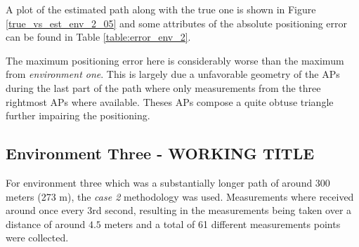 \documentclass{LTHthesis}
\begin{document}
A plot of the estimated path along with the true one is shown in Figure \ref{true_vs_est_env_2_05} and some attributes of the absolute positioning error can be found in Table \ref{table:error_env_2}.

The maximum positioning error here is considerably worse than the maximum from \emph{environment one}. This is largely due a unfavorable geometry of the APs during the last part of the path where only measurements from the three rightmost APs where available. Theses APs compose a quite obtuse triangle further impairing the positioning.  
%
\subsection{Environment Three - WORKING TITLE}
%
For environment three which was a substantially longer path of around 300 meters (273 m), the \emph{case 2} methodology was used. Measurements where received around once every 3rd second, resulting in the measurements being taken over a distance of around $4.5$ meters and a total of 61 different measurements points were collected. 
\end{document}
